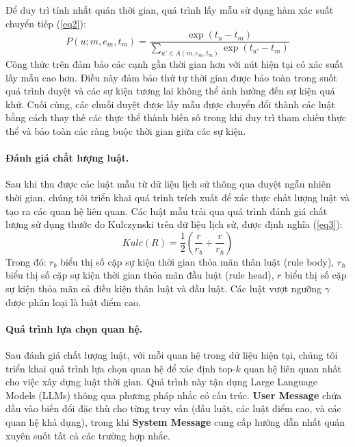 Để duy trì tính nhất quán thời gian, quá trình lấy mẫu sử dụng hàm xác suất chuyển tiếp (\ref{eq2}):
\begin{equation}
    \label{eq2}
    P(u; m, e_m, t_m) = \frac{\exp(t_u - t_m)}{\sum_{u' \in A(m, e_m, t_m)} \exp(t_{u'} - t_m)}
\end{equation}
Công thức trên đảm bảo các cạnh gần thời gian hơn với nút hiện tại có xác suất lấy mẫu cao hơn. Điều này đảm bảo thứ tự thời gian được bảo toàn trong suốt quá trình duyệt và các sự kiện tương lai không thể ảnh hưởng đến sự kiện quá khứ. Cuối cùng, các chuỗi duyệt được lấy mẫu được chuyển đổi thành các luật bằng cách thay thế các thực thể thành biến số trong khi duy trì tham chiếu thực thể và bảo toàn các ràng buộc thời gian giữa các sự kiện.

\paragraph{Đánh giá chất lượng luật.}
Sau khi thu được các luật mẫu từ dữ liệu lịch sử thông qua duyệt ngẫu nhiên thời gian, chúng tôi triển khai quá trình trích xuất để xác thực chất lượng luật và tạo ra các quan hệ liên quan. Các luật mẫu trải qua quá trình đánh giá chất lượng sử dụng thước đo Kulczynski \cite{ref_article16} trên dữ liệu lịch sử, được định nghĩa (\ref{eq3}):
\begin{equation}
\label{eq3}
    Kulc(R) = \frac{1}{2} \left( \frac{r}{r_b} + \frac{r}{r_h} \right)
\end{equation}
Trong đó: \( r_b \) biểu thị số cặp sự kiện thời gian thỏa mãn thân luật (rule body), \( r_h \) biểu thị số cặp sự kiện thời gian thỏa mãn đầu luật (rule head), \( r \) biểu thị số cặp sự kiện thỏa mãn cả điều kiện thân luật và đầu luật. Các luật vượt ngưỡng \( \gamma \) được phân loại là luật điểm cao.

\paragraph{Quá trình lựa chọn quan hệ.} Sau đánh giá chất lượng luật, với mỗi quan hệ trong dữ liệu hiện tại, chúng tôi triển khai quá trình lựa chọn quan hệ để xác định top-$k$ quan hệ liên quan nhất cho việc xây dựng luật thời gian. Quá trình này tận dụng Large Language Models (LLMs) thông qua phương pháp nhắc có cấu trúc. \textbf{User Message} chứa đầu vào biến đổi đặc thù cho từng truy vấn (đầu luật, các luật điểm cao, và các quan hệ khả dụng), trong khi \textbf{System Message} cung cấp hướng dẫn nhất quán xuyên suốt tất cả các trường hợp nhắc.


